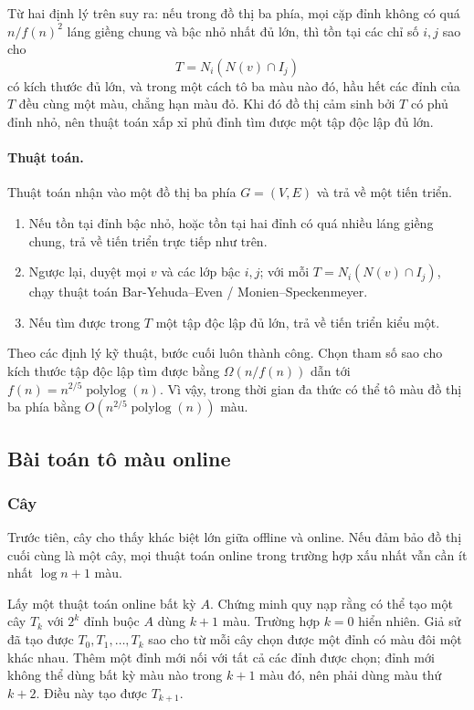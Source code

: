 \documentclass[11pt]{article}
\begin{document}
Từ hai định lý trên suy ra: nếu trong đồ thị ba phía, mọi cặp đỉnh không có quá
$n/f(n)^2$ láng giềng chung và bậc nhỏ nhất đủ lớn, thì tồn tại các chỉ số
$i,j$ sao cho
\[
  T=N_i(N(v)\cap I_j)
\]
có kích thước đủ lớn, và trong một cách tô ba màu nào đó, hầu hết các đỉnh của
$T$ đều cùng một màu, chẳng hạn màu đỏ. Khi đó đồ thị cảm sinh bởi $T$ có phủ
đỉnh nhỏ, nên thuật toán xấp xỉ phủ đỉnh tìm được một tập độc lập đủ lớn.

\paragraph{Thuật toán.}
Thuật toán nhận vào một đồ thị ba phía $G=(V,E)$ và trả về một tiến triển.
\begin{enumerate}
  \item Nếu tồn tại đỉnh bậc nhỏ, hoặc tồn tại hai đỉnh có quá nhiều láng giềng
  chung, trả về tiến triển trực tiếp như trên.
  \item Ngược lại, duyệt mọi $v$ và các lớp bậc $i,j$; với mỗi
  $T=N_i(N(v)\cap I_j)$, chạy thuật toán Bar-Yehuda--Even /
  Monien--Speckenmeyer.
  \item Nếu tìm được trong $T$ một tập độc lập đủ lớn, trả về tiến triển kiểu
  một.
\end{enumerate}

Theo các định lý kỹ thuật, bước cuối luôn thành công. Chọn tham số sao cho kích
thước tập độc lập tìm được bằng $\Omega(n/f(n))$ dẫn tới
$f(n)=n^{2/5}\operatorname{polylog}(n)$. Vì vậy, trong thời gian đa thức có
thể tô màu đồ thị ba phía bằng $O(n^{2/5}\operatorname{polylog}(n))$ màu.

\subsection{Bài toán tô màu online}

\subsubsection{Cây}

Trước tiên, cây cho thấy khác biệt lớn giữa offline và online. Nếu đảm bảo đồ
thị cuối cùng là một cây, mọi thuật toán online trong trường hợp xấu nhất vẫn
cần ít nhất $\log n+1$ màu.

Lấy một thuật toán online bất kỳ $A$. Chứng minh quy nạp rằng có thể tạo một
cây $T_k$ với $2^k$ đỉnh buộc $A$ dùng $k+1$ màu. Trường hợp $k=0$ hiển nhiên.
Giả sử đã tạo được $T_0,T_1,\ldots,T_k$ sao cho từ mỗi cây chọn được một đỉnh
có màu đôi một khác nhau. Thêm một đỉnh mới nối với tất cả các đỉnh được chọn;
đỉnh mới không thể dùng bất kỳ màu nào trong $k+1$ màu đó, nên phải dùng màu
thứ $k+2$. Điều này tạo được $T_{k+1}$.
\end{document}

